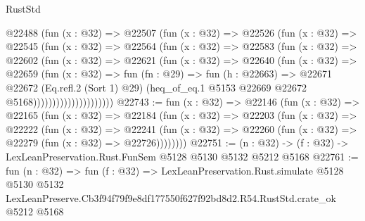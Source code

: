 \begin{lexlean}{RustStd}
\begin{coremodule}
                      @22488
                        (fun (x : @32) =>
                        @22507
                          (fun (x : @32) =>
                          @22526
                            (fun (x : @32) =>
                            @22545
                              (fun (x : @32) =>
                              @22564
                                (fun (x : @32) =>
                                @22583
                                  (fun (x : @32) =>
                                  @22602
                                    (fun (x : @32) =>
                                    @22621
                                      (fun (x : @32) =>
                                      @22640
                                        (fun (x : @32) =>
                                        @22659
                                          (fun (x : @32) =>
                                          fun (fn : @29) =>
                                          fun (h : @22663) =>
                                          @22671
                                            @22672
                                            (Eq.refl.{2} (Sort 1) @29)
                                            (heq_of_eq.{1}
                                              @5153
                                              @22669
                                              @22672
                                              @5168)))))))))))))))))))))
@22743 := fun (x : @32) =>
  @22146
    (fun (x : @32) =>
    @22165
      (fun (x : @32) =>
      @22184
        (fun (x : @32) =>
        @22203
          (fun (x : @32) =>
          @22222
            (fun (x : @32) =>
            @22241
              (fun (x : @32) => @22260 (fun (x : @32) => @22279 (fun (x : @32) => @22726))))))))
@22751 := (n : @32) -> (f : @32) -> LexLeanPreservation.Rust.FunSem @5128 @5130 @5132 @5212 @5168
@22761 := fun (n : @32) =>
  fun (f : @32) =>
  LexLeanPreservation.Rust.simulate
    @5128
    @5130
    @5132
    LexLeanPreserve.Cb3f94f79f9e8df177550f627f92bd8d2.R54.RustStd.crate_ok
    @5212
    @5168
\end{coremodule}
\end{lexlean}
